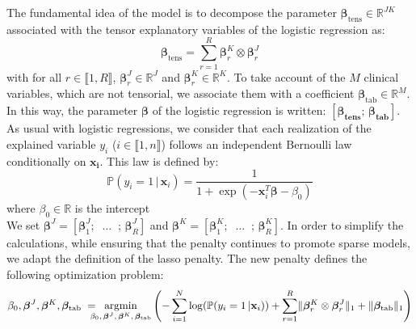\documentclass[10pt]{article}
\begin{document}
\noindent The fundamental idea of the model is to decompose the parameter $\bm{\beta}_{\text{tens}} \in \mathbb{R}^{JK}$ associated with the tensor explanatory variables of the logistic regression as:
\begin{equation}
\bm{\beta}_{\text{tens}} = \sum\limits_{r = 1}^R\bm{\beta}_r^K \otimes \bm{\beta}_r^J
\end{equation}
with for all $r \in \llbracket 1 ,R \rrbracket$, $\bm{\beta}_r^J \in \mathbb{R}^J$ and $\bm{\beta}_r^K \in \mathbb{R}^K$. To take account of the $M$ clinical variables, which are not tensorial, we associate them with a coefficient $\bm{\beta}_{\text{tab}} \in \mathbb{R}^M$. In this way, the parameter $\bm{\beta}$ of the logistic regression is written: $\left[\bm{\beta_{\text{tens}}}; \, \bm{\beta_{\text{tab}}} \right]$.\\
As usual with logistic regressions, we consider that each realization of the explained variable $y_i$ ($i \in \llbracket 1, n \rrbracket$) follows an independent Bernoulli law conditionally on $\mathbf{x_i}$. This law is defined by:
\begin{equation}
\label{eqref:vraisemblance}
\mathbb{P}( y_i = 1\, | \, \mathbf{x}_i) = \frac{1}{1 + \exp(- \mathbf{x}_i^T \bm{\beta} - \beta_0)}
\end{equation}
where  $\beta_0 \in \mathbb{R}$ is the intercept\\ %

\noindent We set  $\bm{\beta}^J = \left[\bm{\beta}_1^J ; \;\; \hdots \; \; ;\,\bm{\beta}_R^J \right]$ and  $\bm{\beta}^K = \left[\bm{\beta}_1^K; \; \; \hdots \; \; ;\,\bm{\beta}_R^K \right]$.
\vspace{5 pt}
\noindent In order to simplify the calculations, while ensuring that the penalty continues to promote sparse models, we adapt the definition of the lasso penalty. The new penalty defines the following optimization problem: %
\begin{equation}
 \beta_0, \bm{\beta}^J, \bm{\beta}^K, \bm{\beta}_{\text{tab}} \; = \hspace{-8pt} \underset{\beta_0 ,\, \bm{\beta}^J, \, \bm{\beta}^K, \, \bm{\beta}_{\text{tab}}}{\text{argmin}} \left( - \sum\limits_{i = 1}^{N} \log(\mathbb{P}(y_i = 1 \, | \mathbf{x}_i)) + \sum\limits_{r = 1}^R 
    \lVert \bm{\beta}_r^K \otimes \bm{\beta}_r^J \rVert_1 + \lVert \bm{\beta}_{\text{tab}} \rVert_1 \right)
\end{equation}
\end{document}
